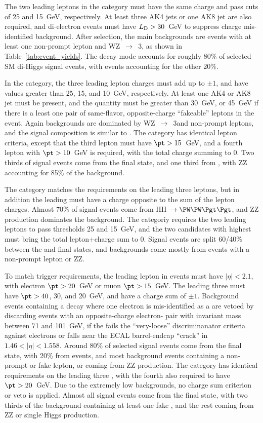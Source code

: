 The two leading leptons in the \llss category must have the same charge and pass
\pt cuts of 25 and 15~GeV, respectively.  At least three AK4 jets or one AK8 jet %
are also required, and di-electron events must have $L_\mathrm{D} > 30$~GeV to suppress
charge mis-identified \Zee background.  After selection, the main \llss
backgrounds are events with at least one non-prompt lepton and WZ~$\to$~3\lep, as shown
in Table~\ref{tab:event_yields}. The \WWWW decay mode accounts for roughly 80\% of
selected SM di-Higgs signal events, with \WWtt events accounting for the other 20\%.

In the \lllnot category, the three leading lepton charges must add up to $\pm1$, and
have \pt values greater than 25, 15, and 10~GeV, respectively.  At least one AK4
or AK8 jet must be present, and the \metLD quantity must be greater than 30~GeV,
or 45~GeV if there is a least one pair of same-flavor, opposite-charge ``fakeable''
leptons in the event.  Again backgrounds are dominated by WZ~$\to$~3\lep and non-prompt
leptons, and the signal composition is similar to \llss.
The \llll category has identical lepton criteria, except that the third lepton
must have $\pt > 15$~GeV, and a fourth lepton with $\pt > 10$~GeV is required, with
the total charge summing to 0.  Two thirds of signal events come from the \WWWW final
state, and one third from \WWtt, with ZZ accounting for 85\% of the background.

The \lllt category matches the \lllnot requirements on the leading three
leptons, but in addition the leading \tauh must have a charge opposite to the sum
of the lepton charges.  Almost 70\% of signal events come from HH~$\to \WWtt$,
and ZZ production dominates the background.  The \lltt categoriy requires
the two leading leptons to pass \pt thresholds 25 and 15~GeV, and the two \tauh
candidates with highest \pt must bring the total lepton+\tauh charge sum to 0.
Signal events are split 60/40\% between the \WWtt and \tttt final
states, and backgrounds come mostly from events with a non-prompt lepton or ZZ.

To match trigger requirements, the leading lepton in \lttt events must have
$|\eta| < 2.1$, with electron $\pt > 20$~GeV or muon $\pt > 15$~GeV.  The leading
three \tauh must have $\pt > 40$, 30, and 20~GeV, and have a charge sum of $\pm1$.
Background events containing a \Zee decay where one electron is mis-identified
as a \tauh are vetoed by discarding events with an opposite-charge electron-\tauh
pair with invariant mass between 71 and 101~GeV, if the \tauh fails the ``very-loose''
discriminanator criteria against electrons or falls near the ECAL barrel-endcap
``crack'' in $1.46 < |\eta| < 1.558$.  Around 80\% of selected signal events come
from the \tttt final state, with 20\% from \WWtt events, and most
background events containing a non-prompt or fake lepton, or coming from ZZ production.
The \noltttt category has identical \pt requirements on the leading three \tauh,
with the fourth \tauh also required to have $\pt > 20$~GeV.  Due to the extremely
low backgrounds, no charge sum criterion or \Zee veto is applied.  Almost
all signal events come from the \tttt final state, with two thirds of the
background containing at least one fake \tauh, and the rest coming from ZZ or single
Higgs production.

